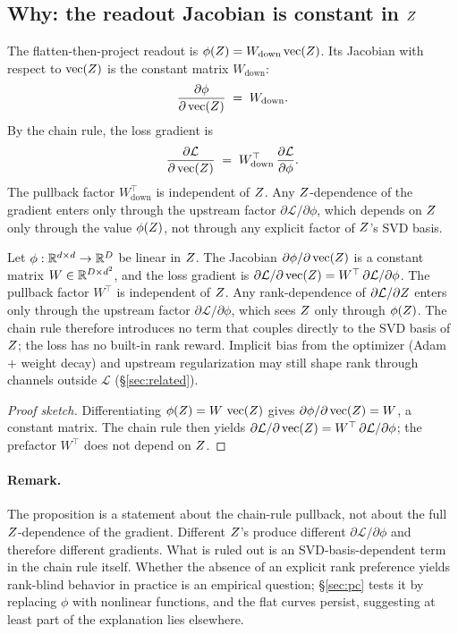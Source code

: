\subsection{Why: the readout Jacobian is constant in $Z$}

The flatten-then-project readout is
$\phi(Z) = W_{\text{down}}\operatorname{vec}(Z)$. Its Jacobian with respect
to $\operatorname{vec}(Z)$ is the constant matrix $W_{\text{down}}$:
\[
\frac{\partial\phi}{\partial\operatorname{vec}(Z)} \;=\; W_{\text{down}}.
\]
By the chain rule, the loss gradient is
\[
\frac{\partial\mathcal{L}}{\partial\operatorname{vec}(Z)}
\;=\;
W_{\text{down}}^{\top}\,
\frac{\partial\mathcal{L}}{\partial\phi}.
\]
The pullback factor $W_{\text{down}}^{\top}$ is independent of
$Z$. Any $Z$-dependence of the gradient enters only through the
upstream factor $\partial\mathcal{L}/\partial\phi$, which depends
on $Z$ only through the value $\phi(Z)$, not through any
explicit factor of $Z$'s SVD basis.

\begin{proposition}
\label{prop:jac}
Let $\phi:\mathbb{R}^{d\times d}\to\mathbb{R}^{D}$ be linear in $Z$. The Jacobian
$\partial\phi/\partial\operatorname{vec}(Z)$ is a constant matrix
$W\in\mathbb{R}^{D\times d^2}$, and the loss gradient is
$\partial\mathcal{L}/\partial\operatorname{vec}(Z) = W^{\top}\,\partial\mathcal{L}/\partial\phi$.
The pullback factor $W^{\top}$ is independent of $Z$. Any
rank-dependence of $\partial\mathcal{L}/\partial Z$ enters only
through the upstream factor $\partial\mathcal{L}/\partial\phi$,
which sees $Z$ only through $\phi(Z)$. The chain rule therefore
introduces no term that couples directly to the SVD basis of
$Z$; the loss has no built-in rank reward. Implicit bias from the
optimizer (Adam $+$ weight decay) and upstream regularization may
still shape rank through channels outside $\mathcal{L}$
(\S\ref{sec:related}).
\end{proposition}

\begin{proof}[Proof sketch]
Differentiating $\phi(Z) = W\,\operatorname{vec}(Z)$ gives
$\partial\phi/\partial\operatorname{vec}(Z) = W$, a constant matrix. The
chain rule then yields
$\partial\mathcal{L}/\partial\operatorname{vec}(Z) = W^{\top}\,\partial\mathcal{L}/\partial\phi$;
the prefactor $W^{\top}$ does not depend on $Z$. \qedhere
\end{proof}

\paragraph{Remark.} The proposition is a statement about the
chain-rule pullback, not about the full $Z$-dependence of the
gradient. Different $Z$'s produce different
$\partial\mathcal{L}/\partial\phi$ and therefore different
gradients. What is ruled out is an SVD-basis-dependent term in
the chain rule itself. Whether the absence of an explicit rank
preference yields rank-blind behavior in practice is an empirical
question; \S\ref{sec:pc} tests it by replacing $\phi$ with
nonlinear functions, and the flat curves persist, suggesting
at least part of the explanation lies elsewhere.

